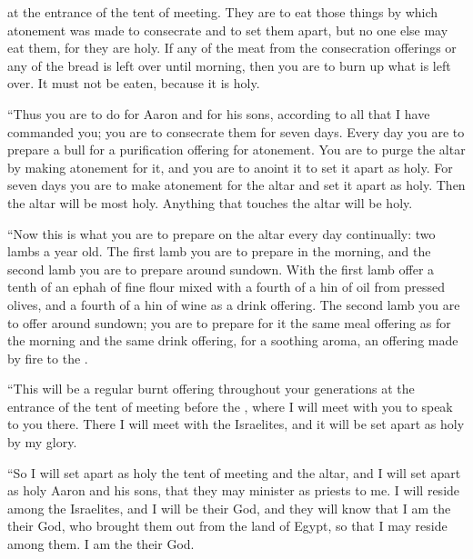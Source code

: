 {at the entrance
of the tent
of meeting.
They are to eat
those things by which
atonement
was made to consecrate
and to set them apart,
but no
one else
may eat
them, for
they
are holy.
If
any
of the meat
from the consecration
offerings or any
of the bread
is left over until
morning,
then
you are to burn up
what is left
over. It must not
be eaten,
because
it is
holy.
\par }{\PP {}“Thus you are to do
for Aaron
and for his sons,
according
to all
that
I have
commanded
you; you are to consecrate
them
for seven
days.
Every day
you are to prepare
a bull
for a purification
offering for atonement.
You are
to purge
the altar
by
making atonement
for it, and you are to anoint
it to set it apart as holy.
For seven
days
you are to make atonement
for the altar
and set it apart
as holy. Then
the altar
will be
most
holy.
Anything
that touches
the altar
will be holy.
\par }{\PP {}“Now this
is what
you are to prepare
on
the altar
every day
continually: two
lambs
a year
old.
The first
lamb
you are
to prepare
in the morning,
and the second
lamb
you are
to prepare
around sundown.
With the first
lamb
offer a tenth of an ephah
of fine flour
mixed
with a fourth
of a hin
of oil
from pressed olives,
and a fourth
of a hin
of wine
as a drink offering.
The
second
lamb
you are
to offer
around sundown;
you are to prepare for it the same meal offering
as for the morning
and the same drink offering,
for a soothing
aroma,
an offering made by fire
to the
{}.
\par }{\PP {}“This will be a regular
burnt offering
throughout your generations
at the entrance
of the tent
of meeting
before
the {}, where
I will meet
with you to speak
to
you there.
There
I will meet
with the Israelites,
and it will be set apart
as holy by my glory.
\par }{\PP {}“So I will set apart
as holy the
tent
of meeting
and the
altar,
and I will set apart
as holy Aaron
and his sons,
that they may minister as priests to me.
I will reside
among
the Israelites,
and I will be
their God,
and they will know
that
I am
the {}
their God,
who
brought them out
from the
land
of Egypt,
so that I may reside
among
them. I am
the {}
their God.


}
